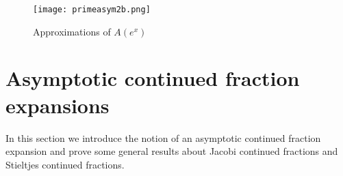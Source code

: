 \documentclass[12pt]{article}
\begin{document}
\begin{figure}[ht!]
\centering
\texttt{[image: primeasym2b.png]}
\caption{Approximations of $A(e^x)$ \label{primeasym2b}}
\end{figure}





\section{Asymptotic continued fraction expansions}

In this section we introduce the notion of an asymptotic continued fraction expansion and prove some general results about Jacobi continued fractions and Stieltjes continued fractions.
\end{document}
